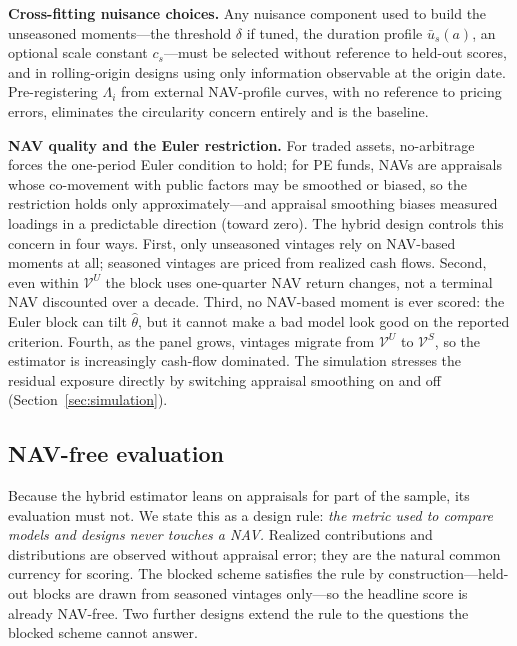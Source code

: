\documentclass[11pt]{article}
\begin{document}
\textbf{Cross-fitting nuisance choices.} Any nuisance component used to build the unseasoned moments---the threshold \(\delta\) if tuned, the duration profile \(\bar u_s(a)\), an optional scale constant \(c_s\)---must be selected without reference to held-out scores, and in rolling-origin designs using only information observable at the origin date. Pre-registering \(\Lambda_i\) from external NAV-profile curves, with no reference to pricing errors, eliminates the circularity concern entirely and is the baseline.

\textbf{NAV quality and the Euler restriction.} For traded assets, no-arbitrage forces the one-period Euler condition to hold; for PE funds, NAVs are appraisals whose co-movement with public factors may be smoothed or biased, so the restriction holds only approximately---and appraisal smoothing biases measured loadings in a predictable direction (toward zero). The hybrid design controls this concern in four ways. First, only unseasoned vintages rely on NAV-based moments at all; seasoned vintages are priced from realized cash flows. Second, even within \(\mathcal V^U\) the block uses one-quarter NAV return changes, not a terminal NAV discounted over a decade. Third, no NAV-based moment is ever scored: the Euler block can tilt \(\hat\theta\), but it cannot make a bad model look good on the reported criterion. Fourth, as the panel grows, vintages migrate from \(\mathcal V^U\) to \(\mathcal V^S\), so the estimator is increasingly cash-flow dominated. The simulation stresses the residual exposure directly by switching appraisal smoothing on and off (Section~\ref{sec:simulation}).

\subsection{NAV-free evaluation}
\label{sec:navfree}

Because the hybrid estimator leans on appraisals for part of the sample, its evaluation must not. We state this as a design rule: \emph{the metric used to compare models and designs never touches a NAV.} Realized contributions and distributions are observed without appraisal error; they are the natural common currency for scoring. The blocked scheme satisfies the rule by construction---held-out blocks are drawn from seasoned vintages only---so the headline score is already NAV-free. Two further designs extend the rule to the questions the blocked scheme cannot answer.
\end{document}
